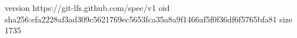version https://git-lfs.github.com/spec/v1
oid sha256:efa2228af3ad309c5621769ec5653fca35a8a9f1466af5f0f36df6f5765bfa81
size 1735
